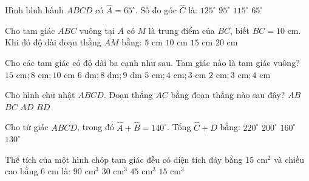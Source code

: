 \documentclass[12pt,a4paper]{article}
\begin{document}
\begin{ex}
Hình bình hành $ABCD$ có $\widehat{A} = 65^\circ$. Số đo góc $\widehat{C}$ là:
\choice
{$125^\circ$}
{$95^\circ$}
{$115^\circ$}
{\True $65^\circ$}
\end{ex}

\begin{ex}
Cho tam giác $ABC$ vuông tại $A$ có $M$ là trung điểm của $BC$, biết $BC = 10\text{ cm}$. Khi đó độ dài đoạn thẳng $AM$ bằng:
\choice
{\True $5\text{ cm}$}
{$10\text{ cm}$}
{$15\text{ cm}$}
{$20\text{ cm}$}
\end{ex}

\begin{ex}
Cho các tam giác có độ dài ba cạnh như sau. Tam giác nào là tam giác vuông?
\choice
{$15\text{ cm}; 8\text{ cm}; 10\text{ cm}$}
{$6\text{ dm}; 8\text{ dm}; 9\text{ dm}$}
{\True $5\text{ cm}; 4\text{ cm}; 3\text{ cm}$}
{$2\text{ cm}; 3\text{ cm}; 4\text{ cm}$}
\end{ex}

\begin{ex}
Cho hình chữ nhật $ABCD$. Đoạn thẳng $AC$ bằng đoạn thẳng nào sau đây?
\choice
{$AB$}
{$BC$}
{$AD$}
{\True $BD$}
\end{ex}

\begin{ex}
Cho tứ giác $ABCD$, trong đó $\widehat{A} + \widehat{B} = 140^\circ$. Tổng $\widehat{C} + \widehat{D}$ bằng:
\choice
{\True $220^\circ$}
{$200^\circ$}
{$160^\circ$}
{$130^\circ$}
\end{ex}

\begin{ex}
Thể tích của một hình chóp tam giác đều có diện tích đáy bằng $15\text{ cm}^2$ và chiều cao bằng $6\text{ cm}$ là:
\choice
{$90\text{ cm}^3$}
{\True $30\text{ cm}^3$}
{$45\text{ cm}^3$}
{$15\text{ cm}^3$}
\end{ex}
\end{document}
